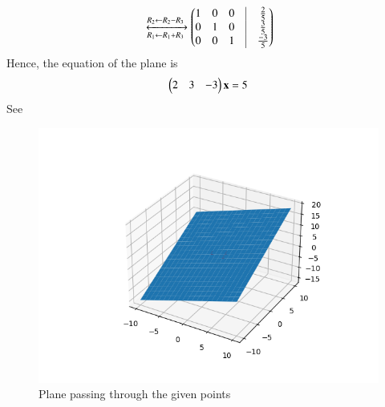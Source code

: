 \begin{enumerate}
\begin{align}
\xleftrightarrow[R_1 \leftarrow R_1 + R_3]{R_2 \leftarrow R_2 - R_3}
\myvec{1&0&0& \vrule& \frac{2}{5}  \\ 0&1&0& \vrule& \frac{3}{5} \\ 0&0&1& \vrule& \frac{-3}{5}}
\end{align}
Hence, the equation of the plane is
\begin{align}
\begin{pmatrix}2 & 3 & -3\end{pmatrix} \mathbf{x} = 5
\end{align}
See 
\begin{figure}[h!]
  \centering
   \includegraphics[width=\columnwidth]{chapters/12/11/3/6/figs/plane_b.png}
    \caption{Plane passing through the given points }
     \label{fig:chapters/12/11/3/6/2}
     \end{figure} 
\end{enumerate}
